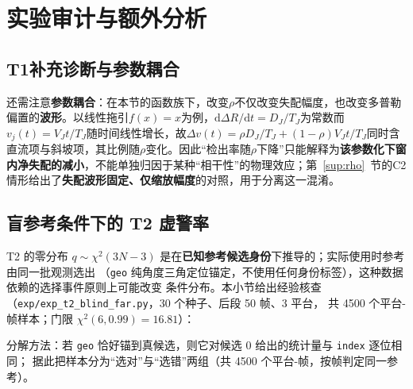 \documentclass[UTF8,a4paper,zihao=-4]{ctexart}
\begin{document}
\section{实验审计与额外分析}\label{sup:audits}


\subsection{T1补充诊断与参数耦合}\label{sup:t1-diagnostic}
还需注意\textbf{参数耦合}：在本节的函数族下，改变\(\rho\)不仅改变失配幅度，也改变多普勒偏置的\textbf{波形}。以线性拖引\(f(x)=x\)为例，\(\mathrm{d}\Delta R/\mathrm{d}t=D_J/T_J\)为常数而\(v_j(t)=V_Jt/T_J\)随时间线性增长，故\(\Delta v(t)=\rho D_J/T_J+(1-\rho)V_Jt/T_J\)同时含直流项与斜坡项，其比例随\(\rho\)变化。因此“检出率随\(\rho\)下降”只能解释为\textbf{该参数化下窗内净失配的减小}，不能单独归因于某种“相干性”的物理效应；第~\ref{sup:rho}~节的C2情形给出了\textbf{失配波形固定、仅缩放幅度}的对照，用于分离这一混淆。



\subsection{盲参考条件下的 T2 虚警率}\label{sup:t2-blind}

T2 的零分布 $q\sim\chi^2(3N-3)$ 是在\textbf{已知参考候选身份}下推导的；实际使用时参考由同一批观测选出
（\texttt{geo} 纯角度三角定位锚定，不使用任何身份标签），这种数据依赖的选择事件原则上可能改变
条件分布。本小节给出经验核查（\texttt{exp/exp\_t2\_blind\_far.py}，30 个种子、后段 50 帧、3 平台，
共 4500 个平台-帧样本；门限 $\chi^2(6,0.99)=16.81$）：

\begin{table}[htbp]\centering\small
\caption{T2 在两种锚定方式下的经验虚警率}\label{tab:t2-blind}
\end{table}

分解方法：若 \texttt{geo} 恰好锚到真候选，则它对候选 0 给出的统计量与 \texttt{index} 逐位相同；
据此把样本分为“选对”与“选错”两组（共 4500 个平台-帧，按帧判定同一参考）。
\end{document}
